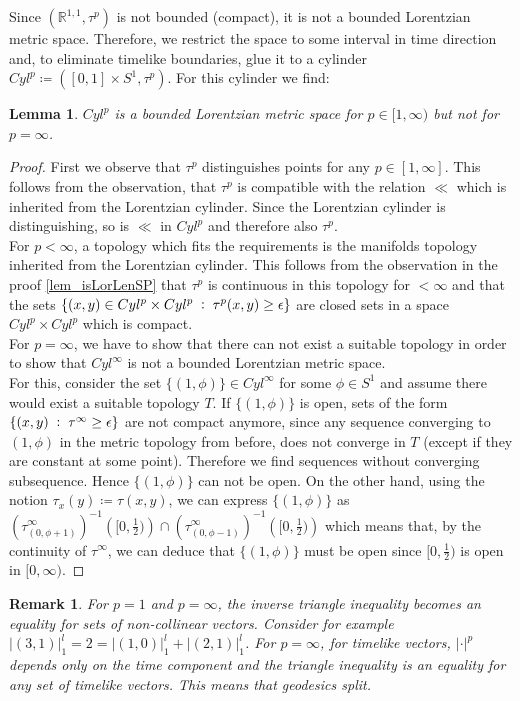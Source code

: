 \documentclass[11pt, a4paper]{article} %
\newcommand{\R}{\mathbb{R}} %
\newtheorem{lemma}[definition]{Lemma}
\theoremstyle{plain} %
\newtheorem{remark}{Remark}
\newcommand{\mDef}{\coloneqq }
\newcommand{\pp}{\; \vcentcolon \;}
\begin{document}
Since $(\R^{1,1},\tau^p)$ is not bounded (compact), it is not a bounded Lorentzian metric space. Therefore, we restrict the space to some interval in time direction and, to eliminate timelike boundaries, glue it to a cylinder $Cyl^p \mDef([0,1]\times S^1,\tau^p)$. For this cylinder we find:
\begin{lemma}
$Cyl^p$ is a bounded Lorentzian metric space for $p\in[1,\infty)$ but not for $p=\infty$.
\end{lemma}
\begin{proof}
First we observe that $\tau^p$ distinguishes points for any $p\in[1,\infty]$. This follows from the observation, that $\tau^p$ is compatible with the relation $\ll$ which is inherited from the Lorentzian cylinder. Since the Lorentzian cylinder is distinguishing, so is $\ll$ in $Cyl^p$ and therefore also $\tau^p$.\\
For $p<\infty$, a topology which fits the requirements is the manifolds topology inherited from the Lorentzian cylinder. This follows from the observation in the proof \ref{lem_isLorLenSP} that $\tau^p$ is continuous in this topology for $<\infty$ and that the sets $\{(x,y)\in Cyl^p\times Cyl^p \pp \tau^p (x,y)\geq \epsilon\}$ are closed sets in a space $Cyl^p\times Cyl^p$ which is compact.\\
For $p=\infty$, we have to show that there can not exist a suitable topology in order to show that $Cyl^\infty$ is not a bounded Lorentzian metric space. \\
For this, consider the set $\{(1,\phi)\}\in Cyl^\infty$ for some $\phi\in S^1$ and assume there would exist a suitable topology $T$.
If $\{(1,\phi)\}$ is open, sets of the form $\{(x,y)\pp \tau^\infty\geq \epsilon\}$ are not compact anymore, since any sequence converging to $(1,\phi)$ in the metric topology from before, does not converge in $T$ (except if they are constant at some point). Therefore we find sequences without converging subsequence. Hence $\{(1,\phi)\}$ can not be open. On the other hand, using the notion $\tau_x(y)\mDef\tau(x,y)$, we can express $\{(1,\phi)\}$ as $\left(\tau^\infty_{(0,\phi+1)}\right)^{-1} \left([0,\frac{1}{2})\right)\cap \left(\tau^\infty_{(0,\phi-1)}\right)^{-1} \left([0,\frac{1}{2})\right)$ which means that, by the continuity of $\tau^\infty$, we can deduce that $\{(1,\phi)\}$ must be open since $[0,\frac{1}{2})$ is open in $[0,\infty)$.
\end{proof}
\begin{remark}
For $p=1$ and $p=\infty$, the inverse triangle inequality becomes an equality for sets of non-collinear vectors. Consider for example $|(3,1)|^l_1 = 2 = |(1,0)|^l_1 + |(2,1)|^l_1$. For $p=\infty$, for timelike vectors, $|\cdot|^p$ depends only on the time component and the triangle inequality is an equality for any set of timelike vectors. This means that geodesics split.
\end{remark}
\end{document}
